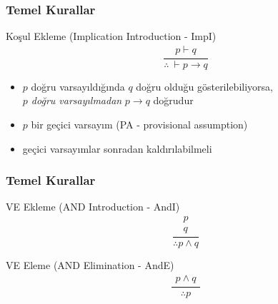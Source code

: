 \documentclass[dvipsnames]{beamer}
\theoremstyle{definition}
\theoremstyle{example}
\theoremstyle{plain}
\begin{document}
\begin{frame}
  \frametitle{Temel Kurallar}

  \begin{block}{Koşul Ekleme (Implication Introduction - ImpI)}
    \[
    \frac
      {
        \begin{array}{c}
          p \vdash q
        \end{array}
      }
      {
        \therefore ~ \vdash p \rightarrow q
      }
    \]
  \end{block}

  \begin{itemize}
    \item $p$ doğru varsayıldığında $q$ doğru olduğu gösterilebiliyorsa,\\
      \emph{$p$ doğru varsayılmadan} $p \rightarrow q$ doğrudur

    \pause
    \medskip
    \item $p$ bir \alert{geçici varsayım} (PA - provisional assumption)
    \item geçici varsayımlar sonradan kaldırılabilmeli
  \end{itemize}
\end{frame}

\begin{frame}
  \frametitle{Temel Kurallar}

  \begin{block}{VE Ekleme (AND Introduction - AndI)}
    \[
    \frac
      {
        \begin{array}{c}
          p\\
          q
        \end{array}
      }
      {
        \therefore p \wedge q
      }
    \]
  \end{block}

  \pause
  \begin{block}{VE Eleme (AND Elimination - AndE)}
  \[
  \frac
    {
      \begin{array}{c}
        p \wedge q
      \end{array}
    }
    {
      \therefore p
    }
  \]
  \end{block}
\end{frame}
\end{document}
